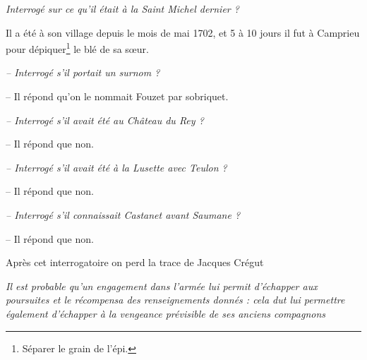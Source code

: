 \vspace{0.35em}

\textit{Interrogé sur ce qu’il était à la Saint Michel dernier ?}

Il a été à son village depuis le mois de mai 1702, et 5 à 10 jours il fut à Camprieu pour dépiquer\footnote{Séparer le grain de l'épi.} le blé de sa sœur.

\vspace{0.2em}

\hspace{5mm}\textit{-- Interrogé s’il portait un surnom ?}

\hspace{10mm}-- Il répond qu’on le nommait Fouzet par sobriquet.

\vspace{0.2em}

\hspace{5mm}\textit{-- Interrogé s’il avait été au Château du Rey ?}

\hspace{10mm}-- Il répond que non.

\vspace{0.2em}

\hspace{5mm}\textit{-- Interrogé s’il avait été à la Lusette avec Teulon ?}

\hspace{10mm}-- Il répond que non.

\vspace{0.2em}

\hspace{5mm}\textit{-- Interrogé s’il connaissait Castanet avant Saumane ?}

\hspace{10mm}-- Il répond que non.

\vspace{0.6em}

\begin{tcolorbox}[
  colback=white,
  colframe=black,
  boxrule=0.7pt,
  arc=0pt,
  left=0.25cm,
  right=0.25cm,
  top=0.12cm,
  bottom=0.12cm,
  boxsep=0pt
]
Après cet interrogatoire on perd la trace de Jacques Crégut

\vspace{0.35em}

\textit{Il est probable qu’un engagement dans l’armée lui permit d’échapper aux poursuites et le récompensa des renseignements donnés : cela dut lui permettre également d’échapper à la vengeance prévisible de ses anciens compagnons}
\end{tcolorbox}

